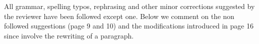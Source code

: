 \documentclass[a4paper,12pt]{article}
\begin{document}
\begin{reviewer}
\begin{figure}
\end{figure}
\clearpage



% 
% 
% 
% 
% 
% 
% 
% 
% 


\reply All grammar, spelling typos, rephrasing and other minor corrections suggested by the reviewer have been followed except one. Below we comment on the non followed suggestions (page 9 and 10) and the modifications introduced in page 16 since involve the rewriting of a paragraph. 


\end{reviewer}
\end{document}
